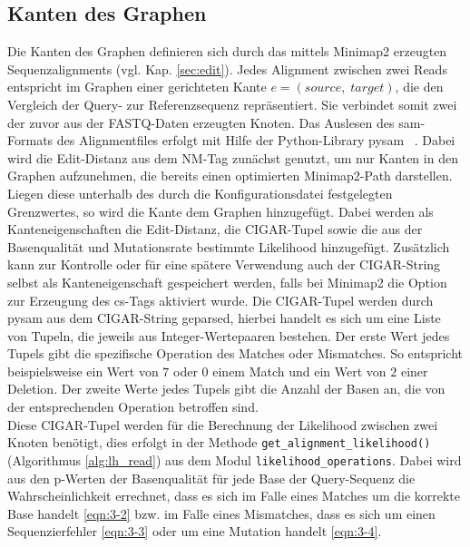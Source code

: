 \subsection{Kanten des Graphen}
Die Kanten des Graphen definieren sich durch das mittels Minimap2 erzeugten Sequenzalignments (vgl. Kap. \ref{sec:edit}). Jedes Alignment zwischen zwei Reads entspricht im Graphen einer gerichteten Kante $e = (source,\; target)$, die den Vergleich der Query- zur Referenzsequenz repräsentiert. Sie verbindet somit zwei der zuvor aus der FASTQ-Daten erzeugten Knoten. Das Auslesen des sam-Formats des Alignmentfiles erfolgt mit Hilfe der Python-Library pysam ~\cite{pysam}. Dabei wird die Edit-Distanz aus dem NM-Tag zunächst genutzt, um nur Kanten in den Graphen aufzunehmen, die bereits einen optimierten Minimap2-Path darstellen. Liegen diese unterhalb des durch die Konfigurationsdatei festgelegten Grenzwertes, so wird die Kante dem Graphen hinzugefügt. Dabei werden als Kanteneigenschaften die Edit-Distanz, die CIGAR-Tupel sowie die aus der Basenqualität und Mutationsrate bestimmte Likelihood hinzugefügt. Zusätzlich kann zur Kontrolle oder für eine spätere Verwendung auch der CIGAR-String selbst als Kanteneigenschaft gespeichert werden, falls bei Minimap2 die Option zur Erzeugung des cs-Tags aktiviert wurde. Die CIGAR-Tupel werden durch pysam aus dem CIGAR-String geparsed, hierbei handelt es sich um eine Liste von Tupeln, die jeweils aus Integer-Wertepaaren bestehen. Der erste Wert jedes Tupels gibt die spezifische Operation des Matches oder Mismatches. So entspricht beispielsweise ein Wert von $ 7 $ oder $ 0 $ einem Match und ein Wert von $ 2 $ einer Deletion. Der zweite Werte jedes Tupels gibt die Anzahl der Basen an, die von der entsprechenden Operation betroffen sind. \\

Diese CIGAR-Tupel werden für die Berechnung der Likelihood zwischen zwei Knoten benötigt, dies erfolgt in der Methode \lstinline|get_alignment_likelihood()| (Algorithmus \ref{alg:lh_read}) aus dem Modul \lstinline|likelihood_operations|. Dabei wird aus den p-Werten der Basenqualität für jede Base der Query-Sequenz die Wahrscheinlichkeit errechnet, dass es sich im Falle eines Matches um die korrekte Base handelt  \eqref{eqn:3-2} bzw. im Falle eines Mismatches, dass es sich um einen Sequenzierfehler \eqref{eqn:3-3} oder um eine Mutation handelt \eqref{eqn:3-4}. \\

